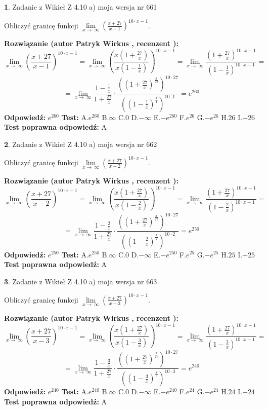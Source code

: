 \documentclass[12pt, a4paper]{article}
\theoremstyle{definition} %
\newtheorem{zad}{}
\newcommand{\zadStart}[1]{\begin{zad}#1\newline}
\newcommand{\zadStop}{\end{zad}}
\newcommand{\rozwStart}[2]{\noindent \textbf{Rozwiązanie (autor #1 , recenzent #2): }\newline}
\newcommand{\rozwStop}{\newline}
\newcommand{\odpStart}{\noindent \textbf{Odpowiedź:}\newline}
\newcommand{\odpStop}{\newline}
\newcommand{\testStart}{\noindent \textbf{Test:}\newline}
\newcommand{\testStop}{\newline}
\newcommand{\kluczStart}{\noindent \textbf{Test poprawna odpowiedź:}\newline}
\newcommand{\kluczStop}{\newline}
\begin{document}
\zadStart{Zadanie z Wikieł Z 4.10 a) moja wersja nr 661}

Obliczyć granicę funkcji  $\lim\limits_{x\to\ \infty}(\frac{x+27}{x-1})^{10\cdot x-1}$.
\zadStop
\rozwStart{Patryk Wirkus}{}
$$\lim\limits_{x\to\ \infty}(\frac{x+27}{x-1})^{10\cdot x-1} = \lim\limits_{x\to\ \infty}(\frac{x(1+\frac{27}{x})}{x(1-\frac{1}{x})})^{10\cdot x-1}=\lim\limits_{x\to\ \infty}\frac{(1+\frac{27}{x})^{10\cdot x-1}}{(1-\frac{1}{x})^{10\cdot x-1}}=$$
$$=\lim\limits_{x\to\ \infty}\frac{1-\frac{1}{x}}{1+\frac{27}{x}}\cdot\frac{((1+\frac{27}{x})^{\frac{x}{27}})^{10\cdot27}}{((1-\frac{1}{x})^{\frac{x}{1}})^{10\cdot1}}=e^{260}$$
\rozwStop
\odpStart
$e^{260}$
\odpStop
\testStart
A.$e^{260}$ B.$\infty$ C.$0$ D.$-\infty$ E.$-e^{260}$
F.$e^{26}$ G.$-e^{26}$
H.$26$
I.$-26$
\testStop
\kluczStart
A
\kluczStop



\zadStart{Zadanie z Wikieł Z 4.10 a) moja wersja nr 662}

Obliczyć granicę funkcji  $\lim\limits_{x\to\ \infty}(\frac{x+27}{x-2})^{10\cdot x-1}$.
\zadStop
\rozwStart{Patryk Wirkus}{}
$$\lim\limits_{x\to\ \infty}(\frac{x+27}{x-2})^{10\cdot x-1} = \lim\limits_{x\to\ \infty}(\frac{x(1+\frac{27}{x})}{x(1-\frac{2}{x})})^{10\cdot x-1}=\lim\limits_{x\to\ \infty}\frac{(1+\frac{27}{x})^{10\cdot x-1}}{(1-\frac{2}{x})^{10\cdot x-1}}=$$
$$=\lim\limits_{x\to\ \infty}\frac{1-\frac{2}{x}}{1+\frac{27}{x}}\cdot\frac{((1+\frac{27}{x})^{\frac{x}{27}})^{10\cdot27}}{((1-\frac{2}{x})^{\frac{x}{2}})^{10\cdot2}}=e^{250}$$
\rozwStop
\odpStart
$e^{250}$
\odpStop
\testStart
A.$e^{250}$ B.$\infty$ C.$0$ D.$-\infty$ E.$-e^{250}$
F.$e^{25}$ G.$-e^{25}$
H.$25$
I.$-25$
\testStop
\kluczStart
A
\kluczStop



\zadStart{Zadanie z Wikieł Z 4.10 a) moja wersja nr 663}

Obliczyć granicę funkcji  $\lim\limits_{x\to\ \infty}(\frac{x+27}{x-3})^{10\cdot x-1}$.
\zadStop
\rozwStart{Patryk Wirkus}{}
$$\lim\limits_{x\to\ \infty}(\frac{x+27}{x-3})^{10\cdot x-1} = \lim\limits_{x\to\ \infty}(\frac{x(1+\frac{27}{x})}{x(1-\frac{3}{x})})^{10\cdot x-1}=\lim\limits_{x\to\ \infty}\frac{(1+\frac{27}{x})^{10\cdot x-1}}{(1-\frac{3}{x})^{10\cdot x-1}}=$$
$$=\lim\limits_{x\to\ \infty}\frac{1-\frac{3}{x}}{1+\frac{27}{x}}\cdot\frac{((1+\frac{27}{x})^{\frac{x}{27}})^{10\cdot27}}{((1-\frac{3}{x})^{\frac{x}{3}})^{10\cdot3}}=e^{240}$$
\rozwStop
\odpStart
$e^{240}$
\odpStop
\testStart
A.$e^{240}$ B.$\infty$ C.$0$ D.$-\infty$ E.$-e^{240}$
F.$e^{24}$ G.$-e^{24}$
H.$24$
I.$-24$
\testStop
\kluczStart
A
\kluczStop
\end{document}
